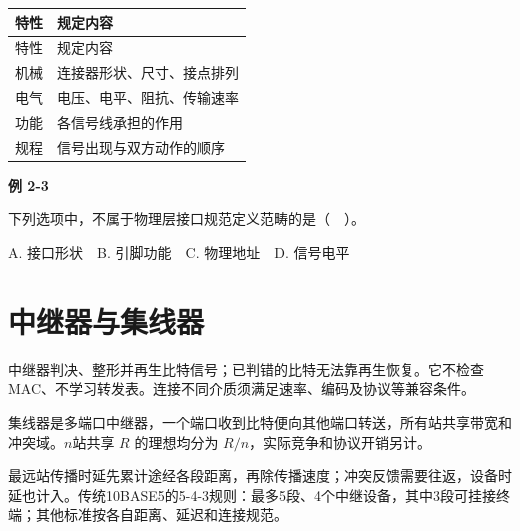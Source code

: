 \par\smallskip
{\fontsize{9.3}{12}\selectfont\setlength{\tabcolsep}{2.5pt}\setlength{\LTleft}{0pt}\setlength{\LTright}{0pt}
\begin{longtable}{@{}>{\raggedright\arraybackslash}p{}>{\raggedright\arraybackslash}p{}@{}}
\toprule
特性 & 规定内容 \\

\midrule\endfirsthead\toprule
特性 & 规定内容 \\

\midrule\endhead\bottomrule\endfoot
机械 & 连接器形状、尺寸、接点排列 \\

电气 & 电压、电平、阻抗、传输速率 \\

功能 & 各信号线承担的作用 \\

规程 & 信号出现与双方动作的顺序 \\

\end{longtable}}
\par\smallskip

\par\medskip{}\noindent\hypertarget{CN02-E03}{}\label{CN02-E03}\textbf{例 2-3}\par\nobreak\smallskip

下列选项中，不属于物理层接口规范定义范畴的是（　）。

A. 接口形状　B. 引脚功能　C. 物理地址　D. 信号电平

\section{中继器与集线器}\label{CN02-repeater}

中继器判决、整形并再生比特信号；已判错的比特无法靠再生恢复。它不检查MAC、不学习转发表。连接不同介质须满足速率、编码及协议等兼容条件。

集线器是多端口中继器，一个端口收到比特便向其他端口转送，所有站共享带宽和冲突域。\(n\)站共享 \(R\) 的理想均分为 \(R/n\)，实际竞争和协议开销另计。

最远站传播时延先累计途经各段距离，再除传播速度；冲突反馈需要往返，设备时延也计入。传统10BASE5的5-4-3规则：最多5段、4个中继设备，其中3段可挂接终端；其他标准按各自距离、延迟和连接规范。
